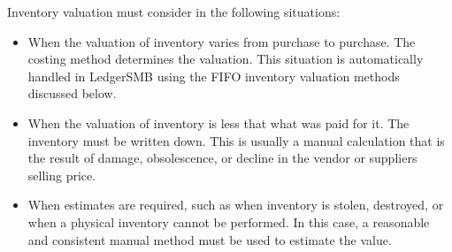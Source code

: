Inventory valuation must consider in the following situations:
\begin{itemize}
        \item When the valuation of inventory varies from purchase to purchase. The costing method
        determines the valuation.  This situation is automatically handled in LedgerSMB using the \gls{FIFO}
        inventory valuation methods discussed below.
        \item When the valuation of inventory is less that what was paid for it. The inventory must
        be written down. This is usually a manual calculation that is the result of damage, obsolescence, 
        or decline in the vendor or suppliers selling price.
        \item When estimates are required, such as when inventory is stolen, destroyed, or when a physical inventory
        cannot be performed. In this case, a reasonable and consistent manual method must be used to 
        estimate the value. 
\end{itemize}

